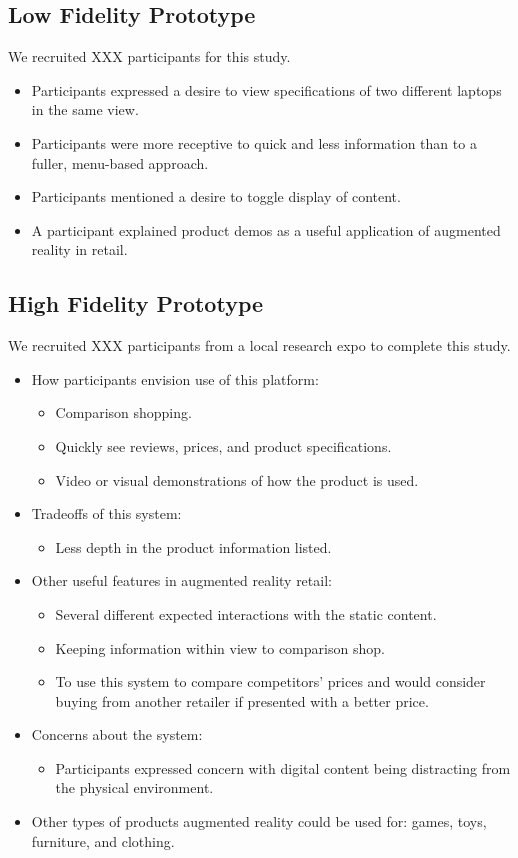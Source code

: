 \subsection{Low Fidelity Prototype}
We recruited XXX participants for this study. 
\begin{itemize}
	\item Participants expressed a desire to view specifications of two different laptops in the same view.
	\item Participants were more receptive to quick and less information than to a fuller, menu-based approach.
	\item Participants mentioned a desire to toggle display of content.
	\item A participant explained product demos as a useful application of augmented reality in retail.
\end{itemize}

\subsection{High Fidelity Prototype}
We recruited XXX participants from a local research expo to complete this study. 
\begin{itemize}
	\item How participants envision use of this platform:
	\begin{itemize} \compresslist%
		\item Comparison shopping.
		\item Quickly see reviews, prices, and product specifications.
		\item Video or visual demonstrations of how the product is used.
	\end{itemize}
	\item Tradeoffs of this system:
		\begin{itemize} \compresslist%
			\item Less depth in the product information listed.
		\end{itemize}
	\item Other useful features in augmented reality retail:
	\begin{itemize} \compresslist%
		\item Several different expected interactions with the static content.
		\item Keeping information within view to comparison shop.
		\item To use this system to compare competitors' prices and would consider buying from another retailer if presented with a better price.
	\end{itemize}
	\item Concerns about the system:
	\begin{itemize} \compresslist%
		\item Participants expressed concern with digital content being distracting from the physical environment.
	\end{itemize}
	\item Other types of products augmented reality could be used for: games, toys, furniture, and clothing.
\end{itemize}